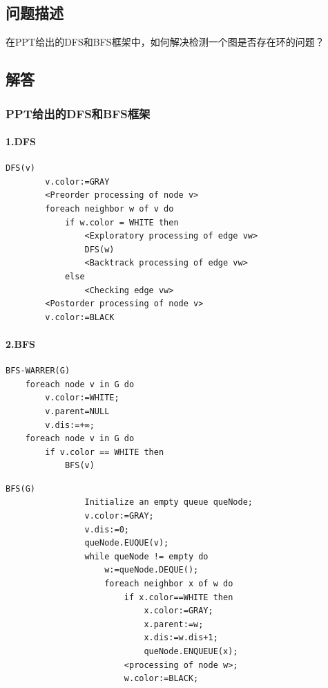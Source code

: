\documentclass{article}
\begin{document}
\subsection{问题描述}

在PPT给出的DFS和BFS框架中，如何解决检测一个图是否存在环的问题？

\subsection{解答}

\subsubsection{PPT给出的DFS和BFS框架}

\paragraph{1.DFS}
\begin{lstlisting}[style=algorithmPPT]
    DFS(v)
        v.color:=GRAY
        <Preorder processing of node v>
        foreach neighbor w of v do
            if w.color = WHITE then
                <Exploratory processing of edge vw>
                DFS(w)
                <Backtrack processing of edge vw>
            else
                <Checking edge vw>
        <Postorder processing of node v>
        v.color:=BLACK
    \end{lstlisting}

\paragraph{2.BFS}
\begin{lstlisting}[style=algorithmPPT]
    BFS-WARRER(G)
    foreach node v in G do
        v.color:=WHITE; 
        v.parent=NULL 
        v.dis:=+∞;
    foreach node v in G do
        if v.color == WHITE then
            BFS(v)
\end{lstlisting}

\begin{lstlisting}[style=algorithmPPT]
            BFS(G)
                Initialize an empty queue queNode;
                v.color:=GRAY;
                v.dis:=0;
                queNode.EUQUE(v);
                while queNode != empty do
                    w:=queNode.DEQUE();
                    foreach neighbor x of w do
                        if x.color==WHITE then
                            x.color:=GRAY;
                            x.parent:=w;
                            x.dis:=w.dis+1;
                            queNode.ENQUEUE(x);
                        <processing of node w>;
                        w.color:=BLACK;
\end{lstlisting}
\end{document}
